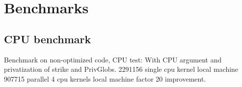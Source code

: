 \documentclass[a4paper, 10pt]{article}
\begin{document}









\section{Benchmarks}

\subsection{CPU benchmark}
Benchmark on non-optimized code, CPU test:
With CPU argument and privatization of strike and PrivGlobs.
2291156 single cpu kernel local machine
907715 parallel 4 cpu kernels local machine
factor 20 improvement.
\end{document}
